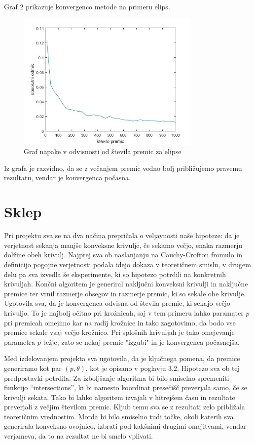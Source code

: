 \documentclass[a4paper]{article}
\begin{document}
Graf 2 prikazuje konvergenco metode na primeru elips.

\begin{figure}[h]
\centering
\includegraphics[width=90mm]{graf_elipsa2.jpg}
\caption{Graf napake v odvisnosti od števila premic za elipse \label{overflow}}
\end{figure} 


Iz grafa je razvidno, da se z večanjem premic vedno bolj približujemo pravemu rezultatu, vendar je konvergenca počasna. 

\section{Sklep}
Pri projektu sva se na dva načina prepričala o veljavnosti naše hipoteze: da je verjetnost sekanja manjše konveksne krivulje, če sekamo večjo, enaka razmerju dolžine obeh krivulj. Najprej sva ob naslanjanju na Cauchy-Crofton fromulo in definicijo pogojne verjetnosti podala idejo dokaza v teoretičnem smislu, v drugem delu pa sva izvedla še eksperimente, ki so hipotezo potrdili na konkretnih krivuljah. 
Končni algoritem je generiral naključni konveksni krivulji in naključne premice ter vrnil razmerje obsegov in razmerje premic, ki so sekale obe krivulje. Ugotovila sva, da je konvergenca odvisna od števila premic, ki sekajo večjo krivuljo. To je najbolj očitno pri krožnicah, saj v tem primeru lahko paramater $p$ pri premicah omejimo kar na radij krožnice in tako zagotovimo, da bodo vse premice sekale vsaj večjo krožnico. Pri splošnih krivuljah je tako omejevanje parametra $p$ težje, zato se nekaj premic "izgubi" in je konvergenca počasnejša. 

Med izdelovanjem projekta sva ugotovila, da je ključnega pomena, da premice generiramo kot par $(p, \theta)$, kot je opisano v poglavju $3.2$. Hipotezo sva ob tej predpostavki potrdila. Za izboljšanje algoritma bi bilo smiselno spremeniti funkcijo ``intersections'', ki bi namesto koordinat presečišč preverjala samo, če se krivulji sekata. Tako bi lahko algoritem izvajali v hitrejšem času in rezultate preverjali z večjim številom premic. Kljub temu sva se z rezultati zelo približala teoretičnim vrednostim. Morda bi bilo smiselno tudi točke, okoli katerih sva generirala konveksno ovojnico, izbrati pod kakšnimi drugimi omejitvami, vendar verjameva, da to na rezultat ne bi smelo vplivati.
\end{document}
